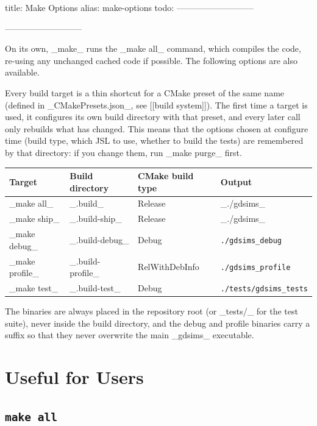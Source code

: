 title: Make Options
alias: make-options
todo:
---------------------------
\usepackage{listings}
---------------------------



On its own, _make_ runs the _make all_ command, which compiles the code, re-using any unchanged cached code if possible. The following options are also available.

Every build target is a thin shortcut for a CMake preset of the same name (defined in _CMakePresets.json_, see [[build system]]). The first time a target is used, it configures its own build directory with that preset, and every later call only rebuilds what has changed. This means that the options chosen at configure time (build type, which JSL to use, whether to build the tests) are remembered by that directory: if you change them, run _make purge_ first.

\begin{center}
	\begin{tabular}{l l l l}
		\bf Target     & \bf Build directory & \bf CMake build type & \bf Output                     \\
		\hline
		_make all_     & _.build_            & Release              & _./gdsims_                     \\
		_make ship_    & _.build-ship_       & Release              & _./gdsims_                     \\
		_make debug_   & _.build-debug_      & Debug                & \texttt{./gdsims\_debug}       \\
		_make profile_ & _.build-profile_    & RelWithDebInfo       & \texttt{./gdsims\_profile}     \\
		_make test_    & _.build-test_       & Debug                & \texttt{./tests/gdsims\_tests}
	\end{tabular}
\end{center}

The binaries are always placed in the repository root (or _tests/_ for the test suite), never inside the build directory, and the debug and profile binaries carry a suffix so that they never overwrite the main _gdsims_ executable.

\section{Useful for Users}
	\subsection{\tt make all}

